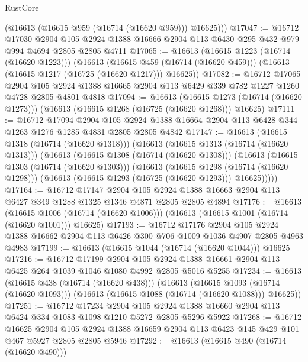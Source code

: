 \begin{lexlean}{RustCore}
\begin{coremodule}
        (@16613 (@16615 @959 (@16714 (@16620 @959))) @16625)))
@17047 := @16712
    @17030
    @2904
    @105
    @2924
    @1388
    @16666
    @2904
    @113
    @6430
    @295
    @432
    @979
    @994
    @4694
    @2805
    @2805
    @4711
@17065 := @16613
    (@16615 @1223 (@16714 (@16620 @1223)))
    (@16613
      (@16615 @459 (@16714 (@16620 @459)))
      (@16613 (@16615 @1217 (@16725 (@16620 @1217))) @16625))
@17082 := @16712
    @17065
    @2904
    @105
    @2924
    @1388
    @16665
    @2904
    @113
    @6429
    @339
    @782
    @1227
    @1260
    @4728
    @2805
    @4801
    @4818
@17094 := @16613
    (@16615 @1273 (@16714 (@16620 @1273)))
    (@16613 (@16615 @1268 (@16725 (@16620 @1268))) @16625)
@17111 := @16712
    @17094
    @2904
    @105
    @2924
    @1388
    @16664
    @2904
    @113
    @6428
    @344
    @1263
    @1276
    @1285
    @4831
    @2805
    @2805
    @4842
@17147 := @16613
    (@16615 @1318 (@16714 (@16620 @1318)))
    (@16613
      (@16615 @1313 (@16714 (@16620 @1313)))
      (@16613
        (@16615 @1308 (@16714 (@16620 @1308)))
        (@16613
          (@16615 @1303 (@16714 (@16620 @1303)))
          (@16613
            (@16615 @1298 (@16714 (@16620 @1298)))
            (@16613 (@16615 @1293 (@16725 (@16620 @1293))) @16625)))))
@17164 := @16712
    @17147
    @2904
    @105
    @2924
    @1388
    @16663
    @2904
    @113
    @6427
    @349
    @1288
    @1325
    @1346
    @4871
    @2805
    @2805
    @4894
@17176 := @16613
    (@16615 @1006 (@16714 (@16620 @1006)))
    (@16613 (@16615 @1001 (@16714 (@16620 @1001))) @16625)
@17193 := @16712
    @17176
    @2904
    @105
    @2924
    @1388
    @16662
    @2904
    @113
    @6426
    @300
    @706
    @1009
    @1036
    @4907
    @2805
    @4963
    @4983
@17199 := @16613 (@16615 @1044 (@16714 (@16620 @1044))) @16625
@17216 := @16712
    @17199
    @2904
    @105
    @2924
    @1388
    @16661
    @2904
    @113
    @6425
    @264
    @1039
    @1046
    @1080
    @4992
    @2805
    @5016
    @5255
@17234 := @16613
    (@16615 @438 (@16714 (@16620 @438)))
    (@16613
      (@16615 @1093 (@16714 (@16620 @1093)))
      (@16613 (@16615 @1088 (@16714 (@16620 @1088))) @16625))
@17251 := @16712
    @17234
    @2904
    @105
    @2924
    @1388
    @16660
    @2904
    @113
    @6424
    @334
    @1083
    @1098
    @1210
    @5272
    @2805
    @5296
    @5922
@17268 := @16712
    @16625
    @2904
    @105
    @2924
    @1388
    @16659
    @2904
    @113
    @6423
    @145
    @429
    @101
    @467
    @5927
    @2805
    @2805
    @5946
@17292 := @16613
    (@16615 @490 (@16714 (@16620 @490)))

\end{coremodule}
\end{lexlean}
